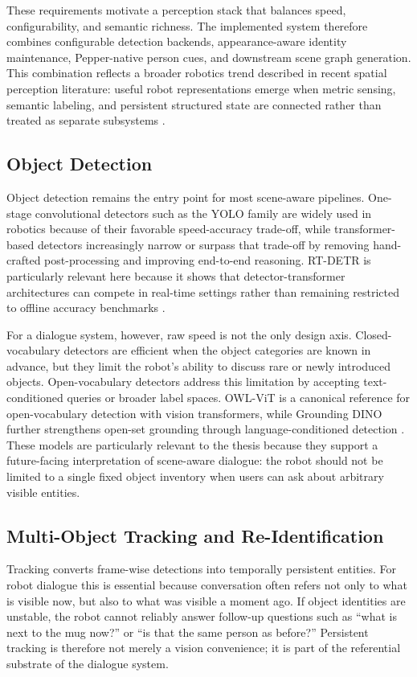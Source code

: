 \documentclass[
  digital,     %
  oneside,     %
  nosansbold,  %
  nocolorbold, %
  lof,         %
  lot,         %
]{fithesis4}
\begin{document}
These requirements motivate a perception stack that balances speed, configurability, and semantic richness. The implemented system therefore combines configurable detection backends, appearance-aware identity maintenance, Pepper-native person cues, and downstream scene graph generation. This combination reflects a broader robotics trend described in recent spatial perception literature: useful robot representations emerge when metric sensing, semantic labeling, and persistent structured state are connected rather than treated as separate subsystems \cite{mascaro_scene_2025, hughes_foundations_2024}.

\subsection{Object Detection}
Object detection remains the entry point for most scene-aware pipelines. One-stage convolutional detectors such as the YOLO family are widely used in robotics because of their favorable speed-accuracy trade-off, while transformer-based detectors increasingly narrow or surpass that trade-off by removing hand-crafted post-processing and improving end-to-end reasoning. RT-DETR is particularly relevant here because it shows that detector-transformer architectures can compete in real-time settings rather than remaining restricted to offline accuracy benchmarks \cite{zhao_detrs_2024}.

For a dialogue system, however, raw speed is not the only design axis. Closed-vocabulary detectors are efficient when the object categories are known in advance, but they limit the robot's ability to discuss rare or newly introduced objects. Open-vocabulary detectors address this limitation by accepting text-conditioned queries or broader label spaces. OWL-ViT is a canonical reference for open-vocabulary detection with vision transformers, while Grounding DINO further strengthens open-set grounding through language-conditioned detection \cite{minderer_simple_2022, liu_grounding_2024}. These models are particularly relevant to the thesis because they support a future-facing interpretation of scene-aware dialogue: the robot should not be limited to a single fixed object inventory when users can ask about arbitrary visible entities.

\subsection{Multi-Object Tracking and Re-Identification}
Tracking converts frame-wise detections into temporally persistent entities. For robot dialogue this is essential because conversation often refers not only to what is visible now, but also to what was visible a moment ago. If object identities are unstable, the robot cannot reliably answer follow-up questions such as ``what is next to the mug now?'' or ``is that the same person as before?'' Persistent tracking is therefore not merely a vision convenience; it is part of the referential substrate of the dialogue system.
\end{document}
